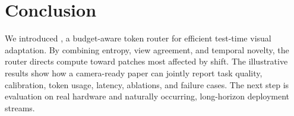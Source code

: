 \section{Conclusion}
\label{sec:conclusion}

We introduced \method, a budget-aware token router for efficient test-time
visual adaptation.  By combining entropy, view agreement, and temporal
novelty, the router directs compute toward patches most affected by shift.  The
illustrative results show how a camera-ready paper can jointly report task
quality, calibration, token usage, latency, ablations, and failure cases.  The
next step is evaluation on real hardware and naturally occurring, long-horizon
deployment streams.

\balance
